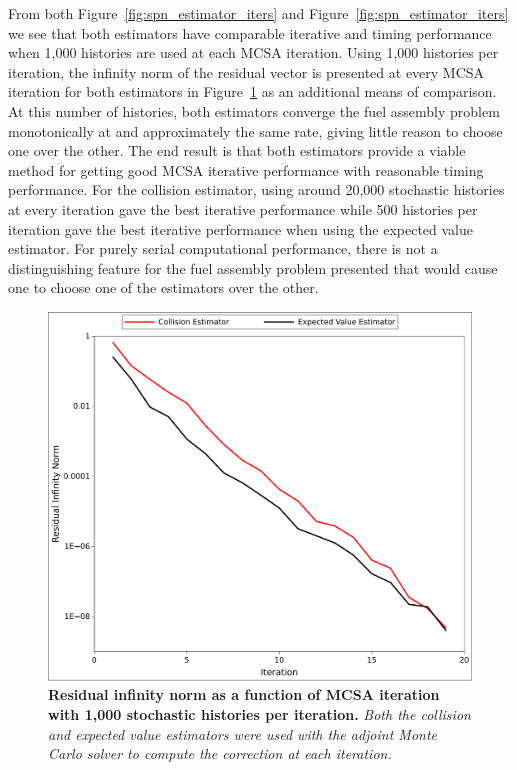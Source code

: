 From both Figure~\ref{fig:spn_estimator_iters} and
Figure~\ref{fig:spn_estimator_iters} we see that both estimators have
comparable iterative and timing performance when 1,000 histories are
used at each MCSA iteration. Using 1,000 histories per iteration, the
infinity norm of the residual vector is presented at every MCSA
iteration for both estimators in
Figure~\ref{fig:spn_estimator_convergence} as an additional means of
comparison. At this number of histories, both estimators converge the
fuel assembly problem monotonically at and approximately the same
rate, giving little reason to choose one over the other. The end
result is that both estimators provide a viable method for getting
good MCSA iterative performance with reasonable timing
performance. For the collision estimator, using around 20,000
stochastic histories at every iteration gave the best iterative
performance while 500 histories per iteration gave the best iterative
performance when using the expected value estimator. For purely serial
computational performance, there is not a distinguishing feature for
the fuel assembly problem presented that would cause one to choose one
of the estimators over the other.

\begin{figure}[t!]
  \begin{center}
    \includegraphics[width=6in]{chapters/spn_equations/estimator_convergence.pdf}
  \end{center}
  \caption{\textbf{Residual infinity norm as a function of MCSA
      iteration with 1,000 stochastic histories per iteration.}
    \textit{Both the collision and expected value estimators were used
      with the adjoint Monte Carlo solver to compute the correction at
      each iteration.}}
  \label{fig:spn_estimator_convergence}
\end{figure}


